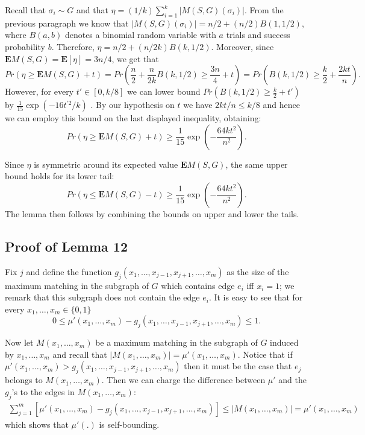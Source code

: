 \documentclass[12pt]{article}
\newcommand{\E}[1]{\mathbf{E}\left[#1\right]}
\newcommand{\Mf}[2]{M(#1,#2)}
\newcommand{\EMf}[2]{\mathbf{E}M(#1,#2)}
\begin{document}
		Recall that $\sigma_i \sim G$ and that $\eta = (1/k) \sum_{i = 1}^k |\Mf{S}{G}(\sigma_i)|$. From the previous paragraph we know that $|\Mf{S}{G}(\sigma_i)| = n/2 + (n/2) B(1,1/2)$, where $B(a,b)$ denotes a binomial random variable with $a$ trials and success probability $b$. Therefore, $\eta = n/2 + (n/2k) B(k, 1/2)$. Moreover, since $\EMf{S}{G} = \E{\eta} = 3n/4$, we get that
\begin{equation*}
			Pr\left(\eta \ge \EMf{S}{G} + t\right) = Pr\left(\frac{n}{2} + \frac{n}{2k} B\left(k, 1/2\right) \ge \frac{3n}{4} + t\right) = Pr\left(B\left(k, 1/2\right) \ge \frac{k}{2} + \frac{2k t}{n}\right).
		\end{equation*}
		However, for every $t' \in [0, k/8]$ we can lower bound $Pr(B\left(k, 1/2\right) \ge \frac{k}{2} + t')$ by $\frac{1}{15} \exp(- 16 t^{\prime 2}/k)$ \cite{matousekVondrak}. By our hypothesis on $t$ we have $2k t / n \le k/8$ and hence we can employ this bound on the last displayed inequality, obtaining:
\begin{equation*}
			Pr\left(\eta \ge \EMf{S}{G} + t\right) \ge \frac{1}{15} \exp\left(- \frac{64 k t^2}{n^2}\right).
		\end{equation*}
		
		Since $\eta$ is symmetric around its expected value $\EMf{S}{G}$, the same upper bound holds for its lower tail:
\begin{equation*}
			Pr\left(\eta \le \EMf{S}{G} - t\right) \ge \frac{1}{15} \exp\left(- \frac{64 k t^2}{n^2}\right).
		\end{equation*}
		The lemma then follows by combining the bounds on upper and lower the tails.


	\subsection{Proof of Lemma 12}
	
			
			Fix $j$ and define the function $g_j(x_1, \ldots, x_{j - 1}, x_{j + 1}, \ldots, x_m)$ as the size of the maximum matching in the subgraph of $G$ which contains edge $e_i$ iff $x_i = 1$; we remark that this subgraph does not contain the edge $e_i$. It is easy to see that for every $x_1, \ldots, x_m \in \{0,1\}$ $$0 \le \mu'(x_1, \ldots, x_m) - g_j(x_1, \ldots, x_{j - 1}, x_{j + 1}, \ldots, x_m) \le 1.$$ 
			
			Now let $M(x_1, \ldots, x_m)$ be a maximum matching in the subgraph of $G$ induced by $x_1, \ldots, x_m$ and recall that $|M(x_1, \ldots, x_m)| = \mu'(x_1, \ldots, x_m)$. Notice that if $\mu'(x_1, \ldots, x_m) > g_j(x_1, \ldots, x_{j - 1}, x_{j + 1}, \ldots, x_m)$ then it must be the case that $e_j$ belongs to $M(x_1, \ldots, x_m)$. Then we can charge the difference between $\mu'$ and the $g_j$'s to the edges in $M(x_1, \ldots, x_m)$:
\begin{eqnarray*}
				\sum_{j=1}^m \left[\mu'(x_1, \ldots, x_m) - g_j(x_1, \ldots, x_{j - 1}, x_{j + 1}, \ldots, x_m) \right] \le |M(x_1, \ldots, x_m)| = \mu'(x_1, \ldots, x_m)
			\end{eqnarray*}
	which shows that $\mu'(.)$ is self-bounding.
\end{document}
